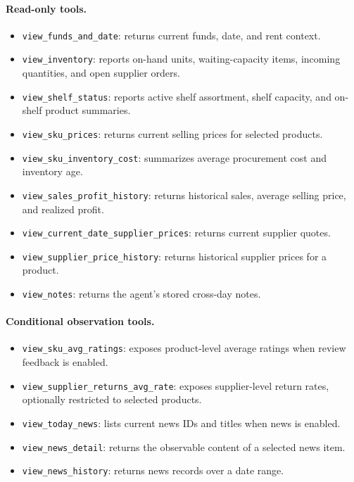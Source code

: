 \paragraph{Read-only tools.}
\begin{itemize}[leftmargin=*,nosep]
    \item \texttt{view\_funds\_and\_date}: returns current funds, date, and rent context.
    \item \texttt{view\_inventory}: reports on-hand units, waiting-capacity items, incoming quantities, and open supplier orders.
    \item \texttt{view\_shelf\_status}: reports active shelf assortment, shelf capacity, and on-shelf product summaries.
    \item \texttt{view\_sku\_prices}: returns current selling prices for selected products.
    \item \texttt{view\_sku\_inventory\_cost}: summarizes average procurement cost and inventory age.
    \item \texttt{view\_sales\_profit\_history}: returns historical sales, average selling price, and realized profit.
    \item \texttt{view\_current\_date\_supplier\_prices}: returns current supplier quotes.
    \item \texttt{view\_supplier\_price\_history}: returns historical supplier prices for a product.
    \item \texttt{view\_notes}: returns the agent's stored cross-day notes.
\end{itemize}

\paragraph{Conditional observation tools.}
\begin{itemize}[leftmargin=*,nosep]
    \item \texttt{view\_sku\_avg\_ratings}: exposes product-level average ratings when review feedback is enabled.
    \item \texttt{view\_supplier\_returns\_avg\_rate}: exposes supplier-level return rates, optionally restricted to selected products.
    \item \texttt{view\_today\_news}: lists current news IDs and titles when news is enabled.
    \item \texttt{view\_news\_detail}: returns the observable content of a selected news item.
    \item \texttt{view\_news\_history}: returns news records over a date range.
\end{itemize}

